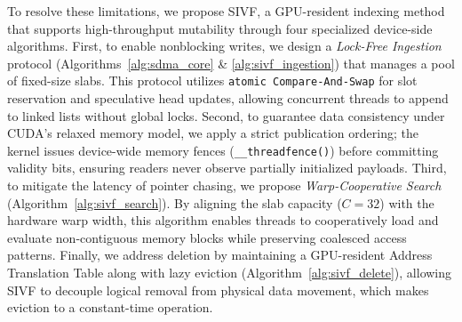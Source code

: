 \documentclass[sigconf,nonacm]{acmart}
\newcommand{\don}[1]{\textcolor{blue}{[Dongfang: #1]}}
\theoremstyle{plain}
\theoremstyle{definition}
\theoremstyle{remark}
\begin{document}

To resolve these limitations, we propose SIVF, a GPU-resident indexing method that supports high-throughput mutability through four specialized device-side algorithms. First, to enable nonblocking writes, we design a \emph{Lock-Free Ingestion} protocol (Algorithms~\ref{alg:sdma_core} \& \ref{alg:sivf_ingestion}) that manages a pool of fixed-size slabs. This protocol utilizes \texttt{atomic Compare-And-Swap} for slot reservation and speculative head updates, allowing concurrent threads to append to linked lists without global locks. Second, to guarantee data consistency under CUDA's relaxed memory model, we apply a strict publication ordering; the kernel issues device-wide memory fences (\verb|__threadfence()|) before committing validity bits, ensuring readers never observe partially initialized payloads. Third, to mitigate the latency of pointer chasing, we propose \emph{Warp-Cooperative Search} (Algorithm~\ref{alg:sivf_search}). By aligning the slab capacity ($C=32$) with the hardware warp width, this algorithm enables threads to cooperatively load and evaluate non-contiguous memory blocks while preserving coalesced access patterns. Finally, we address deletion by maintaining a GPU-resident Address Translation Table along with lazy eviction (Algorithm~\ref{alg:sivf_delete}), allowing SIVF to decouple logical removal from physical data movement, which makes eviction to a constant-time operation.
\end{document}

